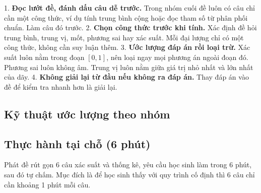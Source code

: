 \documentclass[11pt, a4paper]{article}
\begin{document}
1. \textbf{Đọc lướt đề, đánh dấu câu dễ trước.} Trong nhóm cuối đề luôn có câu chỉ cần một công thức, ví dụ tính trung bình cộng hoặc đọc tham số từ phân phối chuẩn. Làm câu đó trước.
2. \textbf{Chọn công thức trước khi tính.} Xác định đề hỏi trung bình, trung vị, mốt, phương sai hay xác suất. Mỗi đại lượng chỉ có một công thức, không cần suy luận thêm.
3. \textbf{Ước lượng đáp án rồi loại trừ.} Xác suất luôn nằm trong đoạn $[0, 1]$, nên loại ngay mọi phương án ngoài đoạn đó. Phương sai luôn không âm. Trung vị luôn nằm giữa giá trị nhỏ nhất và lớn nhất của dãy.
4. \textbf{Không giải lại từ đầu nếu không ra đáp án.} Thay đáp án vào đề để kiểm tra nhanh hơn là giải lại.

\subsection{Kỹ thuật ước lượng theo nhóm}


\subsection{Thực hành tại chỗ (6 phút)}

Phát đề rút gọn 6 câu xác suất và thống kê, yêu cầu học sinh làm trong 6 phút, sau đó tự chấm. Mục đích là để học sinh thấy với quy trình cố định thì 6 câu chỉ cần khoảng 1 phút mỗi câu.
\end{document}
